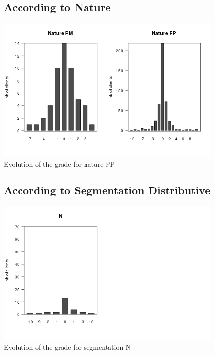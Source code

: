 \documentclass[a4paper, 11pt]{article}
\begin{document}
        \begin{figure}[!ht]
				\subsection{According to Nature}
                \centering
                \includegraphics[height = 10 cm]{Remi/Evolution_of_the_grade_for_nature_PP.png}
                \caption{Evolution of the grade for nature PP}
                \label{fig:e_PP}
        \end{figure}

        \begin{figure}[!ht]
				\subsection{According to Segmentation Distributive}
                \centering
                \includegraphics[height = 10 cm]{Remi/Evolution_of_the_grade_for_segmentation_N.png}
                \caption{Evolution of the grade for segmentation N}
                \label{fig:e_seg_N}
        \end{figure}
\end{document}
